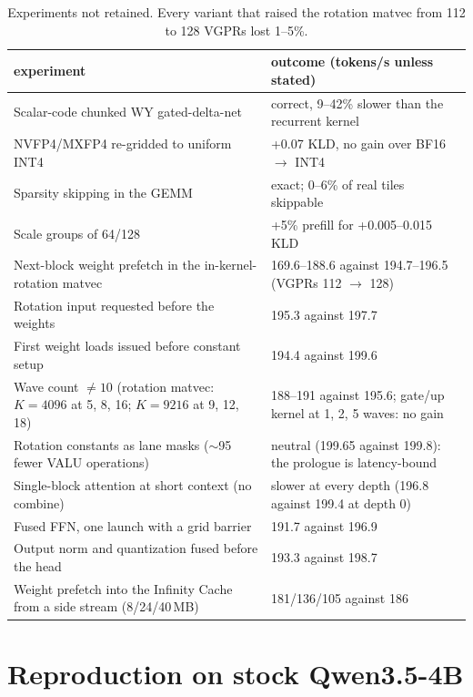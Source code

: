 \documentclass[10.5pt,a4paper]{article}
\begin{document}
\begin{table}[H]
\centering\small
\begin{tabularx}{\linewidth}{@{}>{\raggedright\arraybackslash}p{6.0cm}X@{}}
\toprule
experiment & outcome (tokens/s unless stated)\\
\midrule
Scalar-code chunked WY gated-delta-net & correct, 9--42\% slower than the recurrent kernel\\
NVFP4/MXFP4 re-gridded to uniform INT4 & +0.07 KLD, no gain over BF16 $\to$ INT4\\
Sparsity skipping in the GEMM & exact; 0--6\% of real tiles skippable\\
Scale groups of 64/128 & +5\% prefill for +0.005--0.015 KLD\\
Next-block weight prefetch in the in-kernel-rotation matvec & 169.6--188.6 against 194.7--196.5 (VGPRs 112 $\to$ 128)\\
Rotation input requested before the weights & 195.3 against 197.7\\
First weight loads issued before constant setup & 194.4 against 199.6\\
Wave count $\ne10$ (rotation matvec: $K{=}4096$ at 5, 8, 16; $K{=}9216$ at 9, 12, 18) & 188--191 against 195.6; gate/up kernel at 1, 2, 5 waves: no gain\\
Rotation constants as lane masks ($\sim$95 fewer VALU operations) & neutral (199.65 against 199.8): the prologue is latency-bound\\
Single-block attention at short context (no combine) & slower at every depth (196.8 against 199.4 at depth 0)\\
Fused FFN, one launch with a grid barrier & 191.7 against 196.9\\
Output norm and quantization fused before the head & 193.3 against 198.7\\
Weight prefetch into the Infinity Cache from a side stream (8/24/40\,MB) & 181/136/105 against 186\\
\bottomrule
\end{tabularx}
\caption{Experiments not retained. Every variant that raised the rotation matvec from 112 to 128 VGPRs lost 1--5\%.}
\end{table}

\section{Reproduction on stock Qwen3.5-4B}
\label{sec:repro}
\end{document}

